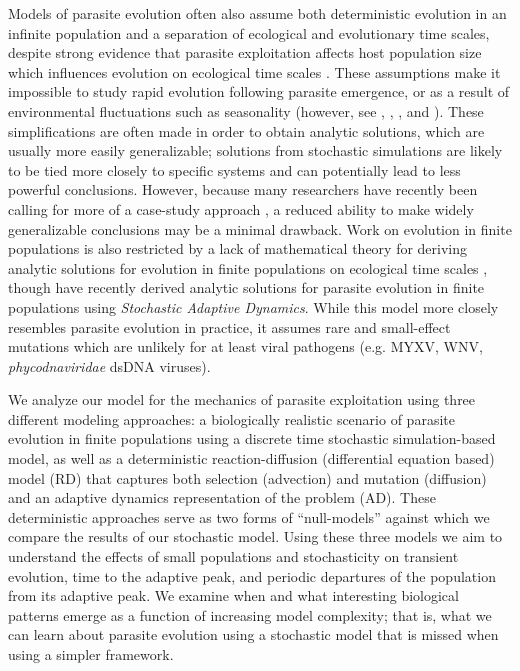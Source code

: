 Models of parasite evolution often also assume both deterministic evolution in an infinite population and a separation of ecological and evolutionary time scales, despite strong evidence that parasite exploitation affects host population size which influences evolution on ecological time scales \citep{Frickeletal.2016, Papkouetal.2016, Frickeletal.2018}. These assumptions make it impossible to study rapid evolution following parasite emergence, or as a result of environmental fluctuations such as seasonality (however, see \citealt{DayandProulx2004}, \citealt{Bolkeretal.2010}, \citealt{Lion2018}, and \citealt{Parsonsetal.2018}). These simplifications are often made in order to obtain analytic solutions, which are usually more easily generalizable; solutions from stochastic simulations are likely to be tied more closely to specific systems and can potentially lead to less powerful conclusions. However, because many researchers have recently been calling for more of a case-study approach \citep{BullandLauring2014, AlizonandMichalakis2015, Cressleretal.2016}, a reduced ability to make widely generalizable conclusions may be a minimal drawback. Work on evolution in finite populations is also restricted by a lack of mathematical theory for deriving analytic solutions for evolution in finite populations on ecological time scales \citep{Lion2018}, though \citet{Parsonsetal.2018} have recently derived analytic solutions for parasite evolution in finite populations using \emph{Stochastic Adaptive Dynamics}. While this model more closely resembles parasite evolution in practice, it assumes rare and small-effect mutations which are unlikely for at least viral pathogens (e.g. MYXV, WNV, \emph{phycodnaviridae} dsDNA viruses). 

We analyze our model for the mechanics of parasite exploitation using three different modeling approaches: a biologically realistic scenario of parasite evolution in finite populations using a discrete time stochastic simulation-based model, as well as a deterministic reaction-diffusion (differential equation based) model (RD) that captures both selection (advection) and mutation (diffusion) and an adaptive dynamics representation of the problem (AD). These deterministic approaches serve as two forms of ``null-models'' against which we compare the results of our stochastic model. Using these three models we aim to understand the effects of small populations and stochasticity on transient evolution, time to the adaptive peak, and periodic departures of the population from its adaptive peak. We examine when and what interesting biological patterns emerge as a function of increasing model complexity; that is, what we can learn about parasite evolution using a stochastic model that is missed when using a simpler framework.

